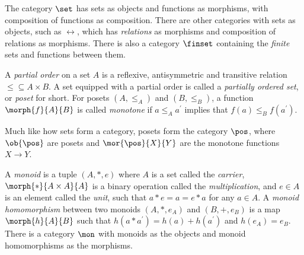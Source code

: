 \begin{example}[Sets]
    The category \(\set\) has sets as objects and functions as morphisms, with
    composition of functions as composition.
    There are other categories with sets as objects, such as \(\rel\), which has
    \emph{relations} as morphisms and composition of relations as morphisms.
    There is also a category \(\finset\) containing the \emph{finite} sets
    and functions between them.
\end{example}

\begin{example}[Posets]
    A \emph{partial order} on a set \(A\) is a reflexive, antisymmetric and
    transitive relation \({\leq} \subseteq A \times B\).
    A set equipped with a partial order is called a
    \emph{partially ordered set}, or \emph{poset} for short.
    For posets \((A,{\leq_A})\) and \((B,{\leq_B})\), a function
    \(\morph{f}{A}{B}\) is called \emph{monotone} if \(a \leq_A a^\prime\)
    implies that \(f(a) \leq_B f(a^\prime)\).

    Much like how sets form a category, posets form the category \(\pos\), where
    \(\ob{\pos}\) are posets and \(\mor{\pos}{X}{Y}\) are the monotone functions
    \(X \to Y\).
\end{example}

\begin{example}[Monoids]\label{ex:monoid}
    A \emph{monoid} is a tuple \((A, *, e)\) where \(A\) is a set called
    the \emph{carrier}, \(\morph{*}{A \times A}{A}\) is a binary operation
    called the \emph{multiplication}, and \(e \in A\) is an element called
    the \emph{unit}, such that \(a * e = a = e * a\) for any
    \(a \in A\).
    A \emph{monoid homomorphism} between two monoids \((A, *, e_A)\) and
    \((B, +, e_B)\) is a map \(\morph{h}{A}{B}\) such that
    \(h(a * a^\prime) = h(a) + h(a^\prime)\) and \(h(e_A) = e_B\).
    There is a category \(\mon\) with monoids as the objects and
    monoid homomorphisms as the morphisms.
\end{example}

